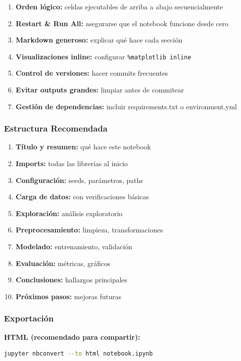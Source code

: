 \documentclass[11pt,a4paper]{article}
\begin{document}
\begin{enumerate}
\item \textbf{Orden lógico:} celdas ejecutables de arriba a abajo secuencialmente
\item \textbf{Restart \& Run All:} asegurarse que el notebook funcione desde cero
\item \textbf{Markdown generoso:} explicar qué hace cada sección
\item \textbf{Visualizaciones inline:} configurar \texttt{\%matplotlib inline}
\item \textbf{Control de versiones:} hacer commits frecuentes
\item \textbf{Evitar outputs grandes:} limpiar antes de commitear
\item \textbf{Gestión de dependencias:} incluir requirements.txt o environment.yml
\end{enumerate}

\subsubsection{Estructura Recomendada}

\begin{enumerate}
\item \textbf{Título y resumen:} qué hace este notebook
\item \textbf{Imports:} todas las librerías al inicio
\item \textbf{Configuración:} seeds, parámetros, paths
\item \textbf{Carga de datos:} con verificaciones básicas
\item \textbf{Exploración:} análisis exploratorio
\item \textbf{Preprocesamiento:} limpieza, transformaciones
\item \textbf{Modelado:} entrenamiento, validación
\item \textbf{Evaluación:} métricas, gráficos
\item \textbf{Conclusiones:} hallazgos principales
\item \textbf{Próximos pasos:} mejoras futuras
\end{enumerate}

\subsubsection{Exportación}

\textbf{HTML (recomendado para compartir):}
\begin{lstlisting}[language=bash]
jupyter nbconvert --to html notebook.ipynb
\end{lstlisting}
\end{document}
